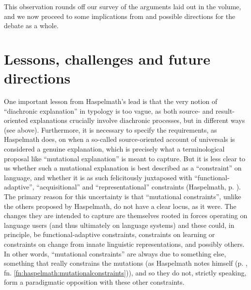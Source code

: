 \documentclass[output=paper]{langsci/langscibook}
\begin{document}
\largerpage[2]
This observation rounds off our survey of the arguments laid out in the volume, and we now proceed to some implications from and possible  directions for the debate as a whole.

\section{Lessons, challenges and future directions}\label{sec:epilogue:2}

One important  lesson from Haspelmath’s lead  is that the very notion of “diachronic explanation” in typology is too vague, as both source- and 
\newpage\noindent
result-oriented explanations crucially involve diachronic processes, but in different ways (see  above). Furthermore, it is necessary to specify the requirements, as Haspelmath does, on when a so-called source-oriented account of universals is considered a genuine explanation, which is precisely what a terminological proposal like “mutational explanation” is meant to capture. But it is less clear to us whether such a mutational explanation is best described as a “constraint” on language, and whether it is as such felicitously juxtaposed with “functional-adaptive”, “acquisitional” and “representational” constraints (Haspelmath, p. \pageref{p:haspelmath:representationalconstraints}). The primary reason for this uncertainty is that “mutational constraints”, unlike the others proposed by Haspelmath, do not have a clear locus, as it were. The changes they are intended to capture are themselves rooted in forces operating on language users (and thus ultimately on language systems) and these could, in principle, be functional-adaptive constraints, constraints on learning or constraints on change from innate linguistic representations, and possibly others. In other words, “mutational constraints” are always due to something else, something that really constrains the mutations (as Haspelmath notes himself (p. \pageref{fn:haspelmath:mutationalconstraints}, fn. \ref{fn:haspelmath:mutationalconstraints})), and so they do not, strictly speaking, form a paradigmatic opposition with these other constraints.
\end{document}
